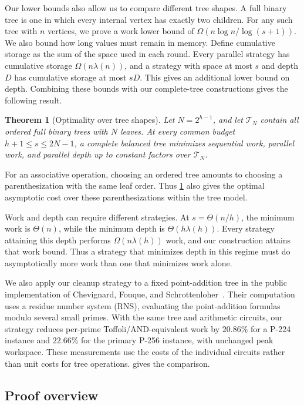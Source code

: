 \documentclass[11pt]{article}
\newtheorem{theorem}{Theorem}[section]
\theoremstyle{definition}
\theoremstyle{remark}
\begin{document}
Our lower bounds also allow us to compare different tree shapes. A full binary tree is one in which every internal vertex has exactly two children. For any such tree with $n$ vertices, we prove a work lower bound of $\Omega(n\log n/\log(s+1))$. We also bound how long values must remain in memory. Define cumulative storage as the sum of the space used in each round. Every parallel strategy has cumulative storage $\Omega(n\lambda(n))$, and a strategy with space at most $s$ and depth $D$ has cumulative storage at most $sD$. This gives an additional lower bound on depth. Combining these bounds with our complete-tree constructions gives the following result.

\begin{theorem}[Optimality over tree shapes]
\label{thm:main-shape}
Let $N=2^{h-1}$, and let $\mathcal T_N$ contain all ordered full binary trees with $N$ leaves. At every common budget $h+1\le s\le2N-1$, a complete balanced tree minimizes sequential work, parallel work, and parallel depth up to constant factors over $\mathcal T_N$.
\end{theorem}

For an associative operation, choosing an ordered tree amounts to choosing a parenthesization with the same leaf order. Thus \cref{thm:main-shape} also gives the optimal asymptotic cost over these parenthesizations within the tree model.

Work and depth can require different strategies. At $s=\Theta(n/h)$, the minimum work is $\Theta(n)$, while the minimum depth is $\Theta(h\lambda(h))$. Every strategy attaining this depth performs $\Omega(n\lambda(h))$ work, and our construction attains that work bound. Thus a strategy that minimizes depth in this regime must do asymptotically more work than one that minimizes work alone.

We also apply our cleanup strategy to a fixed point-addition tree in the public implementation of Chevignard, Fouque, and Schrottenloher~\cite{CFS2026}. Their computation uses a residue number system (RNS), evaluating the point-addition formulas modulo several small primes. With the same tree and arithmetic circuits, our strategy reduces per-prime Toffoli/AND-equivalent work by $20.86\%$ for a P-224 instance and $22.66\%$ for the primary P-256 instance, with unchanged peak workspace. These measurements use the costs of the individual circuits rather than unit costs for tree operations.  gives the comparison.

\subsection{Proof overview}
\end{document}
